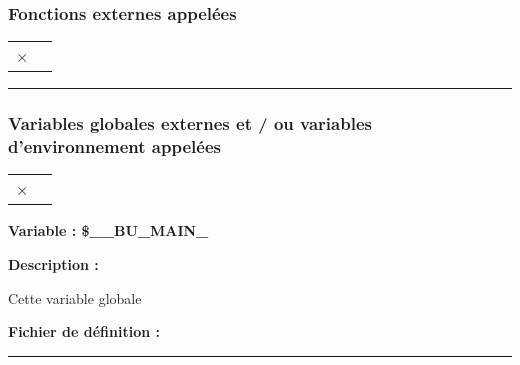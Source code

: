 \documentclass[a4paper,10pt]{article}
\begin{document}
\color{sec3}
\subsubsection{Fonctions externes appelées}\color{text}

\begin{justify}
    \begin{tabular}{|l|l|}
     ×
    \end{tabular}
\end{justify}



\color{sec3}\par\noindent\rule{\textwidth}{0.4pt}\color{text}\setlength{\parskip}{1em}

\color{sec3}
\subsubsection{Variables globales externes et / ou variables d'environnement appelées}\color{text}

\begin{justify}
    \begin{tabular}{|l|l|}
     ×
    \end{tabular}
\end{justify}


\textbf{Variable : \color{vars}\$\_\_BU\_MAIN\_}\\[1\baselineskip]

\setlength{\parskip}{2em}

\begin{justify}
    \textbf{Description :}
\end{justify}

\setlength{\parskip}{1em}

\begin{justify}
    Cette variable globale
\end{justify}

\textbf{Fichier de définition : \color{path}}\\[1\baselineskip]





\color{sec1}\par\noindent\rule{\textwidth}{0.4pt}\color{text}
\end{document}
